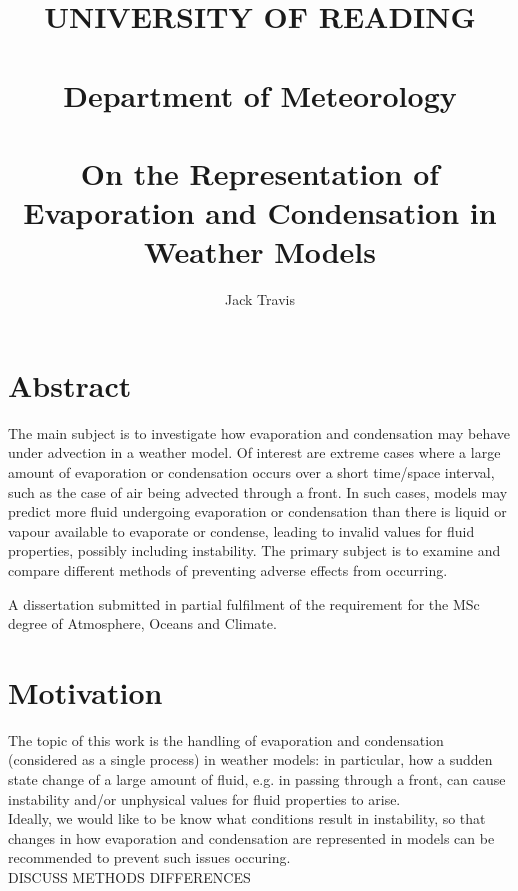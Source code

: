 \documentclass[11pt]{article}
\begin{document}
\thispagestyle{empty}
\title{UNIVERSITY OF READING\\
~\\
Department of Meteorology\\
~\\
On the Representation of Evaporation and Condensation in Weather Models}
\author{Jack Travis}
\maketitle

\section{Abstract}
The main subject is to investigate how evaporation and condensation may behave under advection in a weather model. Of interest are extreme cases where a large amount of evaporation or condensation occurs over a short time/space interval, such as the case of air being advected through a front. In such cases, models may predict more fluid undergoing evaporation or condensation than there is liquid or vapour available to evaporate or condense, leading to invalid values for fluid properties, possibly including instability. The primary subject is to examine and compare different methods of preventing adverse effects from occurring.

\null \vfill
A dissertation submitted in partial fulfilment of the requirement for the MSc degree of Atmosphere, Oceans and Climate.

\newpage
\tableofcontents

\newpage

\section{Motivation}
The topic of this work is the handling of evaporation and condensation (considered as a single process) in weather models: in particular, how a sudden state change of a large amount of fluid, e.g. in passing through a front, can cause instability and/or unphysical values for fluid properties to arise. \\
Ideally, we would like to be know what conditions result in instability, so that changes in how evaporation and condensation are represented in models can be recommended to prevent such issues occuring. \\
DISCUSS METHODS DIFFERENCES
\end{document}
